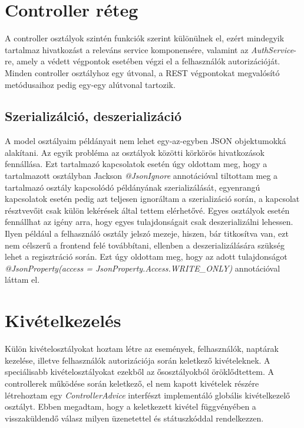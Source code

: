 \documentclass[a4paper,12pt]{report}
\theoremstyle{definition}
\theoremstyle{remark}
\begin{document}
\section{Controller réteg}

A controller osztályok szintén funkciók szerint különülnek el, ezért mindegyik tartalmaz hivatkozást a releváns service komponensére, valamint az \textit{AuthService}-re, amely a védett végpontok esetében végzi el a felhasználók autorizációját. Minden controller osztályhoz egy útvonal, a REST végpontokat megvalósító metódusaihoz pedig egy-egy alútvonal tartozik.

\subsection{Szerializálció, deszerializáció}

A model osztályaim példányait nem lehet egy-az-egyben JSON objektumokká alakítani. Az egyik probléma az osztályok közötti körkörös hivatkozások fennállása. Ezt tartalmazó kapcsolatok esetén úgy oldottam meg, hogy a tartalmazott osztályban Jackson \textit{@JsonIgnore} annotációval tiltottam meg a tartalmazó osztály kapcsolódó példányának szerializálását, egyenrangú kapcsolatok esetén pedig azt teljesen ignoráltam a szerializáció során, a kapcsolat résztvevőit csak külön lekérések által tettem elérhetővé. Egyes osztályok esetén fennállhat az igény arra, hogy egyes tulajdonságait csak deszerializálni lehessen. Ilyen például a felhasználó osztály jelszó mezeje, hiszen, bár titkosítva van, ezt nem célszerű a frontend felé továbbítani, ellenben a deszerializálására szükség lehet a regisztráció során. Ezt úgy oldottam meg, hogy az adott tulajdonságot \textit{@JsonProperty(access = JsonProperty.Access.WRITE\_ONLY)} annotációval láttam el.

\section{Kivételkezelés}

Külön kivételosztályokat hoztam létre az események, felhasználók, naptárak kezelése, illetve felhasználók autorizációja során keletkező kivételeknek. A speciálisabb kivételosztályokat ezekből az ősosztályokból öröklődtettem. A controllerek működése során keletkező, el nem kapott kivételek részére létrehoztam egy \textit{ControllerAdvice} interfészt implementáló globális kivételkezelő osztályt. Ebben megadtam, hogy a keletkezett kivétel függvényében a visszaküldendő válasz milyen üzenetettel és státuszkóddal rendelkezzen.
\end{document}
